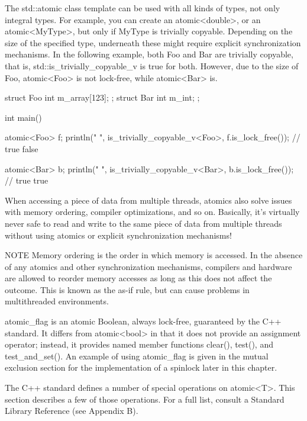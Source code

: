 The std::atomic class template can be used with all kinds of types, not only integral types. For example, you can create an atomic<double>, or an atomic<MyType>, but only if MyType is trivially copyable. Depending on the size of the specified type, underneath these might require explicit synchronization mechanisms. In the following example, both Foo and Bar are trivially copyable, that is, std::is\_trivially\_copyable\_v is true for both. However, due to the size of Foo, atomic<Foo> is not lock-free, while atomic<Bar> is.

\begin{cpp}
struct Foo { int m_array[123]; };
struct Bar { int m_int; };

int main()
{
    atomic<Foo> f;
    println("{} {}", is_trivially_copyable_v<Foo>, f.is_lock_free()); // true false

    atomic<Bar> b;
    println("{} {}", is_trivially_copyable_v<Bar>, b.is_lock_free()); // true true
}
\end{cpp}

When accessing a piece of data from multiple threads, atomics also solve issues with memory ordering, compiler optimizations, and so on. Basically, it’s virtually never safe to read and write to the same piece of data from multiple threads without using atomics or explicit synchronization mechanisms!

\begin{myNotic}{NOTE}
Memory ordering is the order in which memory is accessed. In the absence of any atomics and other synchronization mechanisms, compilers and hardware are allowed to reorder memory accesses as long as this does not affect the outcome. This is known as the as-if rule, but can cause problems in multithreaded environments.
\end{myNotic}

atomic\_flag is an atomic Boolean, always lock-free, guaranteed by the C++ standard. It differs from atomic<bool> in that it does not provide an assignment operator; instead, it provides named member functions clear(), test(), and test\_and\_set(). An example of using atomic\_flag is given in the mutual exclusion section for the implementation of a spinlock later in this chapter.


The C++ standard defines a number of special operations on atomic<T>. This section describes a few of those operations. For a full list, consult a Standard Library Reference (see Appendix B).

